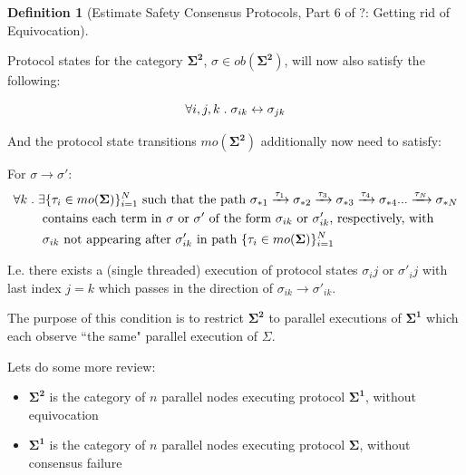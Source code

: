 \documentclass{article}
\theoremstyle{definition}
\newtheorem{defn}{Definition}[section]
\newcommand{\cat}{
	\mathbf
}
\begin{document}
\begin{defn}[Estimate Safety Consensus Protocols, Part 6 of ?: Getting rid of Equivocation]
\begin{description}


Protocol states for the category $\cat{\Sigma^2}$, $\sigma \in ob(\cat{\Sigma^2})$, will now also satisfy the following:

$$
\forall i,j,k \hspace{1mm} . \hspace{1mm} \sigma_{ik} \leftrightarrow \sigma_{jk}
$$

And the protocol state transitions $mo(\cat{\Sigma^2})$ additionally now need to satisfy:

For $\sigma \to \sigma'$:
\begin{align*}  
  \forall k \hspace{1mm} . \hspace{1mm} &\exists \{\tau_i \in mo(\cat{\Sigma})\}_{i=1}^N \text{ such that the path } \sigma_{*1} \xrightarrow[]{\tau_1} \sigma_{*2} \xrightarrow[]{\tau_3} \sigma_{*3} \xrightarrow[]{\tau_4} \sigma_{*4}... \xrightarrow[]{\tau_N} \sigma_{*N} \\
  &\text{ contains each term in $\sigma$ or $\sigma'$ of the form $\sigma_{ik}$ or $\sigma'_{ik}$, respectively, with} \\
  &\text{ $\sigma_{ik}$ not appearing after $\sigma'_{ik}$ in path $\{\tau_i \in mo(\cat{\Sigma})\}_{i=1}^N$ }
\end{align*}

I.e. there exists a (single threaded) execution of protocol states $\sigma_ij$ or $\sigma'_ij$ with last index $j = k$ which passes in the direction of $\sigma_{ik} \to \sigma'_{ik}$. 

The purpose of this condition is to restrict $\cat{\Sigma^2}$ to parallel executions of $\cat{\Sigma^1}$ which each observe ``the same" parallel execution of $\Sigma$.
\end{description}
\end{defn}

Lets do some more review: 

\begin{itemize}
\item $\cat{\Sigma^2}$ is the category of $n$ parallel nodes executing protocol $\cat{\Sigma^1}$, without equivocation
\item $\cat{\Sigma^1}$ is the category of $n$ parallel nodes executing protocol $\cat{\Sigma}$, without consensus failure 
\end{itemize}
\end{document}
